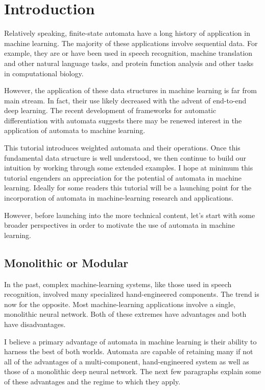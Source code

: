 \section{Introduction}
\label{sec:introduction}

Relatively speaking, finite-state automata have a long history of application
in machine learning. The majority of these applications involve sequential
data.  For example, they are or have been used in speech recognition, machine
translation and other natural language tasks, and protein function analysis and
other tasks in computational biology.

However, the application of these data structures in machine learning is far
from main stream. In fact, their use likely decreased with the advent of
end-to-end deep learning. The recent development of frameworks for automatic
differentiation with automata suggests there may be renewed interest in the
application of automata to machine learning.

This tutorial introduces weighted automata and their operations. Once this
fundamental data structure is well understood, we then continue to build our
intuition by working through some extended examples.  I hope at minimum this
tutorial engenders an appreciation for the potential of automata in machine
learning. Ideally for some readers this tutorial will be a launching point for
the incorporation of automata in machine-learning research and applications.

However, before launching into the more technical content, let's start with
some broader perspectives in order to motivate the use of automata in machine
learning.

\subsection{Monolithic or Modular}

In the past, complex machine-learning systems, like those used in speech
recognition, involved many specialized hand-engineered components. The trend
is now for the opposite. Most machine-learning applications involve a single,
monolithic neural network. Both of these extremes have advantages and both have
disadvantages.

I believe a primary advantage of automata in machine learning is their
ability to harness the best of both worlds. Automata are capable of retaining
many if not all of the advantages of a multi-component, hand-engineered system
as well as those of a monolithic deep neural network. The next few paragraphs
explain some of these advantages and the regime to which they apply.

